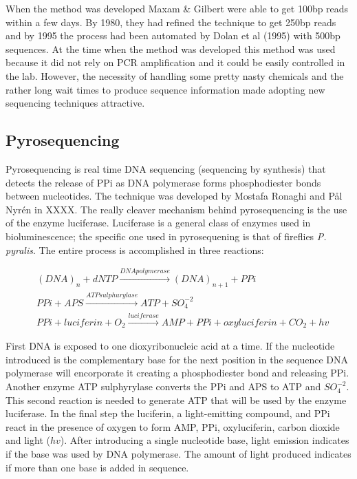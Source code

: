 \documentclass{report}\usepackage[]{graphicx}\usepackage[]{color}
\begin{document}
When the method was developed Maxam \& Gilbert were able to get 100bp reads within a few days. 
By 1980, they had refined the technique to get 250bp reads and by 1995 the process had been 
automated by Dolan et al (1995) with 
500bp sequences. At the time when the method was developed this method was used because 
it did not rely on PCR
amplification and it could be easily controlled in the lab. However, the necessity of handling some 
pretty nasty chemicals
and the rather long wait times to produce sequence information made adopting new sequencing 
techniques attractive. 

\subsection*{Pyrosequencing}
Pyrosequencing is real time DNA sequencing (sequencing by synthesis) that detects the 
release of PPi as DNA polymerase forms
phosphodiester bonds between nucleotides. The technique was developed by  Mostafa Ronaghi 
and Pål Nyrén in XXXX. 
The really cleaver mechanism behind pyrosequencing is the use of the enzyme luciferase.
Luciferase is a general class of enzymes used in bioluminescence; the specific one used in 
pyrosequening
is that of fireflies \textit{P. pyralis}. The entire process is accomplished in three reactions: 

\begin{equation*}
\begin{aligned}
& (DNA)_n + dNTP \xrightarrow{DNA polymerase} (DNA)_{n+1} + PPi \\
& PPi + APS  \xrightarrow{ATP sulphurylase} ATP + SO_4^{-2}\\
& PPi + luciferin + O_2 \xrightarrow {luciferase} AMP + PPi + oxyluciferin + CO_2 + hv 
\end{aligned}
\end{equation*}


First DNA is exposed to one dioxyribonucleic acid at a time. If the nucleotide introduced is the
complementary base for the next position in the sequence DNA polymerase will encorporate it
creating a phosphodiester bond and releasing PPi. Another enzyme ATP sulphyrylase converts the
PPi and APS to ATP and $SO_4^{-2}$. This second reaction is needed to generate ATP that will be used
by the enzyme luciferase. In the final step the luciferin, a light-emitting compound,
and PPi react in the presence of oxygen to form AMP, PPi, oxyluciferin, carbon dioxide and light ($hv$).
After introducing a single nucleotide base, light emission indicates if the base was used by DNA 
polymerase. The amount of light produced indicates if more than one base is added in sequence. 
\end{document}
